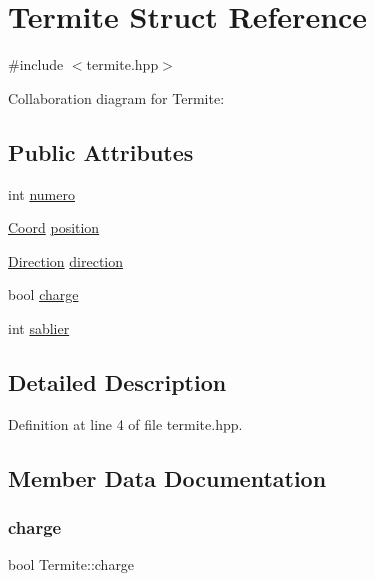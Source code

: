 \hypertarget{structTermite}{}\section{Termite Struct Reference}
\label{structTermite}


{\ttfamily \#include $<$termite.\+hpp$>$}



Collaboration diagram for Termite\+:
\subsection*{Public Attributes}
\begin{DoxyCompactItemize}
\item 
int \hyperlink{structTermite_a46adc25bf86ecdb46da04691190e680e}{numero}
\item 
\hyperlink{structCoord}{Coord} \hyperlink{structTermite_ab15e5a7c1ffc20223c2bf9d158509a06}{position}
\item 
\hyperlink{coord_8hpp_a224b9163917ac32fc95a60d8c1eec3aa}{Direction} \hyperlink{structTermite_ac9efb06efee1f16991a1d7fea6d38b83}{direction}
\item 
bool \hyperlink{structTermite_ab37ce8d57baf99929e64571ade6b985d}{charge}
\item 
int \hyperlink{structTermite_a708e35f65d0dada0f662f0212aefcea9}{sablier}
\end{DoxyCompactItemize}


\subsection{Detailed Description}


Definition at line 4 of file termite.\+hpp.



\subsection{Member Data Documentation}
\mbox{\label{structTermite_ab37ce8d57baf99929e64571ade6b985d}} 
\subsubsection{\texorpdfstring{charge}{charge}}
{\footnotesize\ttfamily bool Termite\+::charge}



